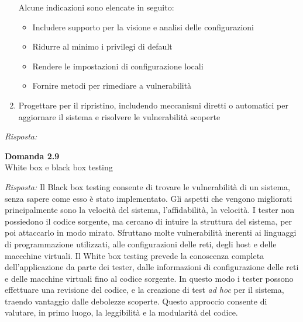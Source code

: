 \documentclass{article}
\newenvironment{problem}[2][Domanda]
    { \begin{mdframed}[backgroundcolor=gray!20] \textbf{#1 #2} \\}
    {  \end{mdframed}}
\newenvironment{solution}
    {\textit{Risposta:}}
    {}
\begin{document}
\begin{enumerate}
	\newline
	Alcune indicazioni sono elencate in seguito:
	\begin{itemize}
		\item Includere supporto per la visione e analisi delle configurazioni
		\item Ridurre al minimo i privilegi di default
		\item Rendere le impostazioni di configurazione locali
		\item Fornire metodi per rimediare a vulnerabilità
	\end{itemize}
	\item Progettare per il ripristino, includendo meccanismi diretti o automatici per aggiornare il sistema e risolvere le vulnerabilità scoperte
\end{enumerate}
\begin{solution}

\end{solution}

\begin{problem}{2.9}
White box e black box testing
\end{problem}
\begin{solution}
Il Black box testing consente di trovare le vulnerabilità di un sistema, senza sapere come esso è stato implementato.
Gli aspetti che vengono migliorati principalmente sono la velocità del sistema, l'affidabilità, la velocità.
I tester non possiedono il codice sorgente, ma cercano di intuire la struttura del sistema, per poi attaccarlo in modo mirato.
\newline
Sfruttano molte vulnerabilità inerenti ai linguaggi di programmazione utilizzati, alle configurazioni delle reti, degli host e delle maccchine virtuali.
\newline
Il White box testing prevede la conoscenza completa dell'applicazione da parte dei tester, dalle informazioni di configurazione delle reti e delle macchine virtuali fino al codice sorgente.
In questo modo i tester possono effettuare una revisione del codice, e la creazione di test \textit{ad hoc} per il sistema, traendo vantaggio dalle debolezze scoperte.
Questo approccio consente di valutare, in primo luogo, la leggibilità e la modularità del codice.
\end{solution}
\end{document}
